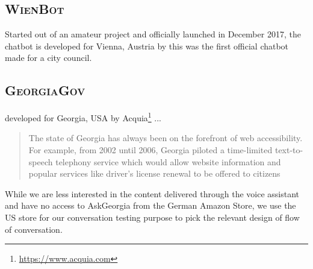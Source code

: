 \subsection*{\textsc{WienBot}}
Started out of an amateur project and officially launched in December 2017, the chatbot is developed for Vienna, Austria by 
this was the first official chatbot made for a city council. 




\subsection*{\textsc{GeorgiaGov}}
developed for Georgia, USA by Acquia\footnote{\url{https://www.acquia.com}} ...

\begin{quotation}
The state of Georgia has always been on the forefront of web accessibility. For example, from 2002 until 2006, Georgia piloted a time-limited text-to-speech telephony service which would allow website information and popular services like driver's license renewal to be offered to citizens \cite{dries:georgia}
\end{quotation} 


	While we are less interested in the content delivered through the voice assistant and have no access to AskGeorgia from the German Amazon Store, we use the US store for our conversation testing purpose to pick the relevant design of flow of conversation. %

















